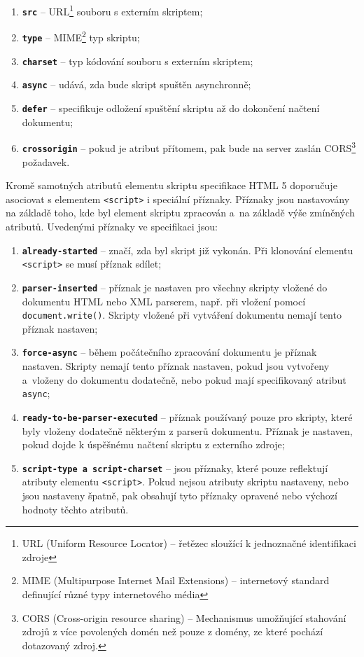 \begin{enumerate}
  \item \textbf{\texttt{src}} -- URL\footnote{URL (Uniform Resource Locator) -- řetězec sloužící k jednoznačné identifikaci zdroje} souboru s externím skriptem;
  \item \textbf{\texttt{type}} -- MIME\footnote{MIME (Multipurpose Internet Mail Extensions) -- internetový standard definující různé typy internetového média} typ skriptu;
  \item \textbf{\texttt{charset}} -- typ kódování souboru s externím skriptem;
  \item \textbf{\texttt{async}} -- udává, zda bude skript spuštěn asynchronně;
  \item \textbf{\texttt{defer}} -- specifikuje odložení spuštění skriptu až do dokončení načtení dokumentu;
  \item \textbf{\texttt{crossorigin}} -- pokud je atribut přítomem, pak bude na server zaslán CORS\footnote{ CORS (Cross-origin resource sharing) -- Mechanismus umožňující stahování zdrojů z více povolených domén než pouze z domény, ze které pochází dotazovaný zdroj.} požadavek. 
\end{enumerate}

Kromě samotných atributů elementu skriptu specifikace HTML 5 doporučuje asociovat s elementem \texttt{<script>} i speciální příznaky. Příznaky jsou nastavovány na základě toho, kde byl element skriptu zpracován a~na základě výše zmíněných atributů. Uvedenými příznaky ve specifikaci jsou:

\begin{enumerate}
  \item \textbf{\texttt{already-started}} -- značí, zda byl skript již vykonán. Při klonování elementu \texttt{<script>} se musí příznak sdílet;
  \item \textbf{\texttt{parser-inserted}} -- příznak je nastaven pro všechny skripty vložené do dokumentu HTML nebo XML parserem, např. při vložení pomocí \texttt{document.write()}. Skripty vložené při vytváření dokumentu nemají tento příznak nastaven;
  \item \textbf{\texttt{force-async}} -- během počátečního zpracování dokumentu je příznak nastaven. Skripty nemají tento příznak nastaven, pokud jsou vytvořeny a~vloženy do dokumentu dodatečně, nebo pokud mají specifikovaný atribut \texttt{async};
  \item \textbf{\texttt{ready-to-be-parser-executed}} -- příznak používaný pouze pro skripty, které byly vloženy dodatečně některým z parserů dokumentu. Příznak je nastaven, pokud dojde k úspěšnému načtení skriptu z externího zdroje;
  \item \textbf{\texttt{script-type a~script-charset}} -- jsou příznaky, které pouze reflektují atributy elementu \texttt{<script>}. Pokud nejsou atributy skriptu nastaveny, nebo jsou nastaveny špatně, pak obsahují tyto příznaky opravené nebo výchozí hodnoty těchto atributů.
\end{enumerate}

